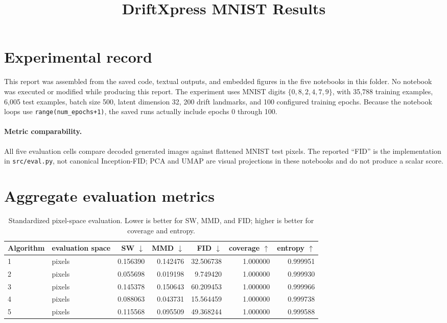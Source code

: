 \documentclass[10pt]{article}
\title{DriftXpress MNIST Results}
\author{}
\date{}
\newcommand{\down}{\ensuremath{\downarrow}}
\newcommand{\up}{\ensuremath{\uparrow}}
\begin{document}
\maketitle

\section*{Experimental record}

This report was assembled from the saved code, textual outputs, and embedded
figures in the five notebooks in this folder.  No notebook was executed or
modified while producing this report.  The experiment uses MNIST digits
\(\{0,8,2,4,7,9\}\), with 35,788 training examples, 6,005 test examples,
batch size 500, latent dimension 32, 200 drift landmarks, and 100 configured
training epochs.  Because the notebook loops use \texttt{range(num\_epochs+1)},
the saved runs actually include epochs 0 through 100.

\paragraph{Metric comparability.}
All five evaluation cells compare decoded generated images against flattened
MNIST test pixels.  The reported ``FID'' is the implementation in
\texttt{src/eval.py}, not canonical Inception-FID; PCA and UMAP are visual
projections in these notebooks and do not produce a scalar score.

\section*{Aggregate evaluation metrics}

\begin{table}[htbp]
\centering
\small
\caption{Standardized pixel-space evaluation. Lower is better for SW, MMD, and FID; higher is better for coverage and entropy.}
\begin{tabular}{l l rrrrr}
\hline
Algorithm & evaluation space & SW $\down$ & MMD $\down$ & FID $\down$ & coverage $\up$ & entropy $\up$ \\
\hline
1 & pixels & 0.156390 & 0.142476 & 32.506738 & 1.000000 & 0.999951 \\
2 & pixels & 0.055698 & 0.019198 & 9.749420 & 1.000000 & 0.999930 \\
3 & pixels & 0.145378 & 0.150643 & 60.209453 & 1.000000 & 0.999966 \\
4 & pixels & 0.088063 & 0.043731 & 15.564459 & 1.000000 & 0.999738 \\
5 & pixels & 0.115568 & 0.095509 & 49.368244 & 1.000000 & 0.999588 \\
\hline
\end{tabular}
\end{table}
\end{document}
